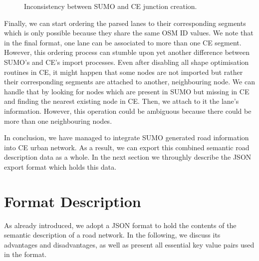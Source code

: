 \begin{figure}[htb]
	\centering
	\caption{Inconsistency between SUMO and CE junction creation.}
\end{figure}

Finally, we can start ordering the parsed lanes to their corresponding segments which is only possible because they share the same OSM ID values. We note that in the final format, one lane can be associated to more than one CE segment. However, this ordering process can stumble upon yet another difference between SUMO's and CE's import processes. Even after disabling all shape optimisation routines in CE, it might happen that some nodes are not imported but rather their corresponding segments are attached to another, neighbouring node. We can handle that by looking for nodes which are present in SUMO but missing in CE and finding the nearest existing node in CE. Then, we attach to it the lane's information. However, this operation could be ambiguous because there could be more than one neighbouring nodes. 

In conclusion, we have managed to integrate SUMO generated road information into CE urban network. As a result, we can export this combined semantic road description data as a whole. In the next section we throughly describe the JSON export format which holds this data.

\section{Format Description}
\label{sec:format}
As already introduced, we adopt a JSON format to hold the contents of the semantic description of a road network. In the following, we discuss its advantages and disadvantages, as well as present all essential key value pairs used in the format.

